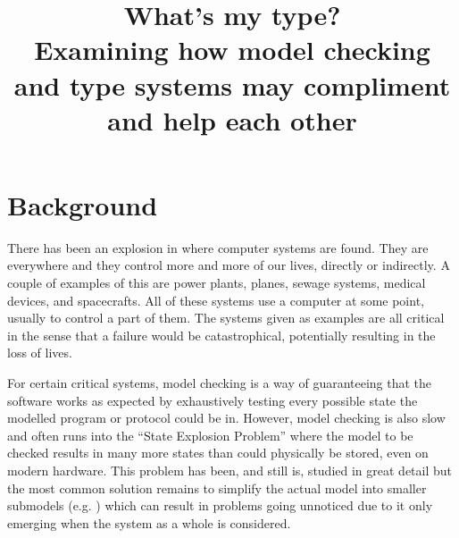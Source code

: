 \documentclass[11pt]{article}
\title{What's my type?\\Examining how model checking and type systems may
       compliment and help each other}
\date{}
\begin{document}
    \maketitle

    \section*{Background}
    There has been an explosion in where computer systems are found. They are
    everywhere and they control more and more of our lives, directly or
    indirectly. A couple of examples of this are power plants, planes, sewage
    systems, medical devices, and spacecrafts. All of these systems use a
    computer at some point, usually to control a part of them. The systems
    given as examples are all critical in the sense that a failure would be
    catastrophical, potentially resulting in the loss of lives.
    
    For certain critical systems, model checking is a way of guaranteeing that
    the software works as expected by exhaustively testing every possible state
    the modelled program or protocol could be in. However, model checking is
    also slow and often runs into the ``State Explosion Problem''
    \cite{goos_state_1998} where the model to be checked results in many more
    states than could physically be stored, even on modern hardware. This
    problem has been, and still is, studied in great detail
    \cite{goos_progress_2001,stuart_simulation-verification_2001,demri_parametric_2006,clarke_model_2008,kress-gazit_correct_2011,meyer_model_2012}
    but the most common solution remains to simplify the actual model into
    smaller submodels (e.g. \cite{yan_sun_verifying_2007}) which can result in
    problems going unnoticed due to it only emerging when the system as a whole
    is considered.\\
    
\end{document}
